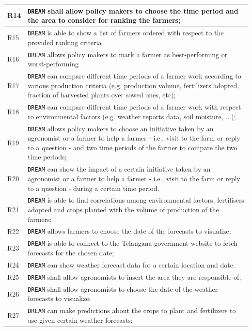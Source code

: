 \documentclass{article}
\begin{document}
\begin{longtable}[c]{|m{0.75cm}|m{11cm}|}
  \hline
R14\label{R} & \verb|DREAM| shall allow policy makers to choose the time period and the area to consider for ranking the farmers;\\
  \hline
R15\label{R} & \verb|DREAM| is able to show a list of farmers ordered with respect to the provided ranking criteria\\
  \hline
  R16\label{R} & \verb|DREAM| allows policy makers to mark a farmer as best-performing or worst-performing\\
  \hline
R17\label{R} & \verb|DREAM| can compare different time periods of a farmer work according to various production criteria (e.g. production volume, fertilizers adopted, fraction of harvested plants over sowed ones, etc);\\
  \hline
R18\label{R} & \verb|DREAM| can compare different time periods of a  farmer work with respect to environmental factors (e.g. weather reports data, soil moisture, ...);\\
  \hline
R19\label{R} & \verb|DREAM| allows policy makers to choose an initiative taken by an agronomist or a farmer to help a farmer - i.e., visit to the farm or reply to a question - and two time periods of the farmer to compare the two time periods;\\
  \hline
R20\label{R} & \verb|DREAM| can show the impact of a certain initiative taken by an agronomist or a farmer to help a farmer - i.e., visit to the farm or reply to a question - during a certain time period.\\
  \hline
  R21\label{R} & \verb|DREAM| is able to find correlations among environmental factors, fertilisers adopted and crops planted with the volume of production of the farmers;\\
  \hline
R22\label{R} & \verb|DREAM| allows farmers to choose the date of the forecasts to visualize;\\
  \hline
R23\label{R} & \verb|DREAM| is able to connect to the Telangana government website to fetch forecasts for the chosen date;\\
  \hline
R24\label{R} & \verb|DREAM| can show weather forecast data for a certain location and date.\\
  \hline
R25\label{R} & \verb|DREAM| shall allow agronomists to insert the area they are responsible of;\\
  \hline
R26\label{R} & \verb|DREAM| shall allow agronomists to choose the date of the weather forecasts to visualize;\\
  \hline
R27\label{R} & \verb|DREAM| can make predictions about the crops to plant and fertilizers to use given certain weather forecasts;\\

\end{longtable}
\end{document}
